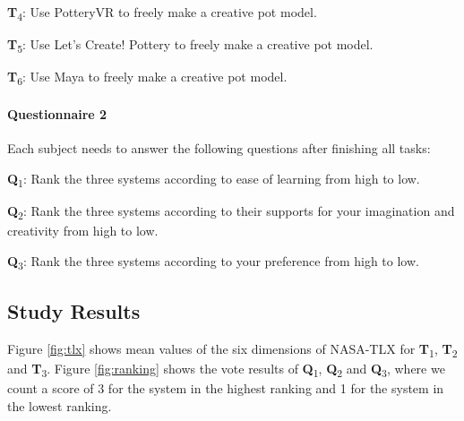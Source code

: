 \documentclass{svjour3}                     %
\begin{document}
\textbf{T}\textsubscript{4}: Use PotteryVR to freely make a creative pot model.

\textbf{T}\textsubscript{5}: Use Let's Create! Pottery to freely make a creative pot model.

\textbf{T}\textsubscript{6}: Use Maya to freely make a creative pot model.

\paragraph{Questionnaire 2} Each subject needs to answer the following questions after finishing all tasks:

\textbf{Q}\textsubscript{1}: Rank the three systems according to ease of learning from high to low.

\textbf{Q}\textsubscript{2}: Rank the three systems according to their supports for your imagination and creativity from high to low.

\textbf{Q}\textsubscript{3}: Rank the three systems according to your preference from high to low.


\subsection{Study Results}
\label{sec:6.4}



Figure \ref{fig:tlx} shows mean values of the six dimensions of NASA-TLX for \textbf{T}\textsubscript{1}, \textbf{T}\textsubscript{2} and \textbf{T}\textsubscript{3}.
Figure \ref{fig:ranking} shows the vote results of \textbf{Q}\textsubscript{1}, \textbf{Q}\textsubscript{2} and \textbf{Q}\textsubscript{3}, where we count a score of 3 for the system in the highest ranking and 1 for the system in the lowest ranking. 


\end{document}
